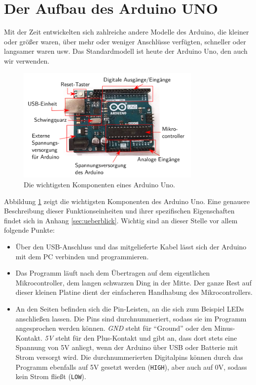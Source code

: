 \section{Der Aufbau des Arduino UNO}
Mit der Zeit entwickelten sich zahlreiche andere Modelle des Arduino, die kleiner oder größer waren, über mehr oder weniger Anschlüsse verfügten, schneller oder langsamer waren usw. Das Standardmodell ist heute der Arduino Uno, den auch wir verwenden.

\begin{figure}[h]
	\centering
	\includegraphics[width=0.8\textwidth]{pics/arduino-beschriftet.png}
	\caption{Die wichtigsten Komponenten eines Arduino Uno.}
	\label{abb:arduino-beschriftet}
\end{figure}

Abbildung \ref{abb:arduino-beschriftet} zeigt die wichtigsten Komponenten des Arduino Uno. Eine genauere Beschreibung dieser Funktionseinheiten und ihrer spezifischen Eigenschaften findet sich in Anhang \ref{sec:ueberblick}. Wichtig sind an dieser Stelle vor allem folgende Punkte:
\begin{itemize}
	\item Über den USB-Anschluss und das mitgelieferte Kabel lässt sich der Arduino mit dem PC verbinden und programmieren.
	\item Das Programm läuft nach dem Übertragen auf dem eigentlichen Mikrocontroller, dem langen schwarzen Ding in der Mitte. Der ganze Rest auf dieser kleinen Platine dient der einfacheren Handhabung des Mikrocontrollers.
	\item An den Seiten befinden sich die Pin-Leisten, an die sich zum Beispiel LEDs anschließen lassen. Die Pins sind durchnummeriert, sodass sie im Programm angesprochen werden können. \emph{GND} steht für \enquote{Ground} oder den Minus-Kontakt. \emph{5V} steht für den Plus-Kontakt und gibt an, dass dort stets eine Spannung von 5V anliegt, wenn der Arduino über USB oder Batterie mit Strom versorgt wird. Die durchnummerierten Digitalpins können durch das Programm ebenfalls auf 5V gesetzt werden (\texttt{HIGH}), aber auch auf 0V, sodass kein Strom fließt (\texttt{LOW}).
\end{itemize}
\vfill

